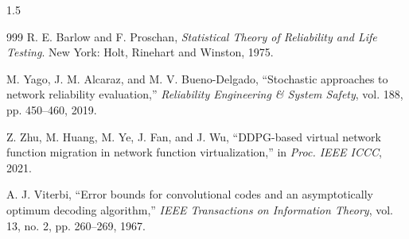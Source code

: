 \documentclass[A4paper,12pt]{report}
\theoremstyle{plain}
\theoremstyle{definition}
\theoremstyle{remark}
\numberwithin{equation}{section}
\begin{document}
\begin{spacing}{1.5}
\begin{thebibliography}{999}
R. E. Barlow and F. Proschan, \textit{Statistical Theory of Reliability and Life Testing}. New York: Holt, Rinehart and Winston, 1975.

M. Yago, J. M. Alcaraz, and M. V. Bueno-Delgado, ``Stochastic approaches to network reliability evaluation,'' \textit{Reliability Engineering \& System Safety}, vol. 188, pp. 450--460, 2019.

Z. Zhu, M. Huang, M. Ye, J. Fan, and J. Wu, ``DDPG-based virtual network function migration in network function virtualization,'' in \textit{Proc. IEEE ICCC}, 2021.

A. J. Viterbi, ``Error bounds for convolutional codes and an asymptotically optimum decoding algorithm,'' \textit{IEEE Transactions on Information Theory}, vol. 13, no. 2, pp. 260--269, 1967.

\end{thebibliography}
\end{spacing}
\end{document}
